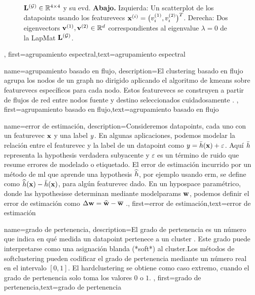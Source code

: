 {{\begin{figure}[H]
\begin{center}
{					${\bf L}^{(\mathcal{G})}  \in \mathbb{R}^{4 \times 4}$ y su \gls{evd}. 
					{\bf Abajo.} Izquierda: Un \gls{scatterplot} de los \gls{datapoint}s usando los \gls{featurevec}s 
					${\bf x}^{(i)} = \big( v^{(1)}_{i},v^{(2)}_{i} \big)^{T}$. 
					Derecha: Dos \gls{eigenvector}s ${\bf v}^{(1)},{\bf v}^{(2)} \in \mathbb{R}^{d}$ 
					correspondientes al \gls{eigenvalue} $\lambda=0$ de la \gls{LapMat} ${\bf L}^{(\mathcal{G})}$. 
					} 
			\end{center}
		\end{figure}
	\newpage}, 
	first={agrupamiento espectral},text={agrupamiento espectral} 
}
{name={agrupamiento basado en flujo},
	description={El \gls{clustering} basado en flujo agrupa los nodos de un 
		\gls{graph} no dirigido aplicando el algoritmo de \gls{kmeans} sobre
		\gls{featurevec}s específicos para cada nodo. Estos \gls{featurevec}s se construyen a partir de flujos de red entre nodos 
		fuente y destino seleccionados cuidadosamente \cite{FlowSpecClustering2021}. }, 
	first={agrupamiento basado en flujo},text={agrupamiento basado en flujo} 
}



{name={error de estimación},
	description={Consideremos \gls{datapoint}s, cada uno con un \gls{featurevec} ${\bf x}$ y una \gls{label} 
		$y$. En algunas aplicaciones, podemos modelar la relación entre el \gls{featurevec} y la \gls{label}
		de un \gls{datapoint} como $y = \bar{h}({\bf x}) + \varepsilon$. Aquí $\bar{h}$ 
		representa la \gls{hypothesis} verdadera subyacente y $\varepsilon$ es un término de ruido que resume errores de modelado o etiquetado.
		El error de estimación incurrido por un método de \gls{ml} que aprende una \gls{hypothesis} $\widehat{h}$, por ejemplo usando \gls{erm}, se define como 
		$\widehat{h}({\bf x}) - \bar{h}({\bf x})$, para algún \gls{featurevec} dado. 
		En un \gls{hypospace} paramétrico, donde las \gls{hypothesis}se determinan mediante
		\gls{modelparams} ${\bf w}$, podemos definir el error de estimación como  $\Delta {\bf w} = \widehat{{\bf w}} - \overline{{\bf w}}$ \cite{kay,hastie01statisticallearning}.},
	first={error de estimación},text={error de estimación} 
}


{name={grado de pertenencia},
	description={El grado de pertenencia es un número que indica en qué medida un \gls{datapoint} 
		pertenece a un \gls{cluster} \cite[Ch. 8]{MLBasics}. Este grado puede interpretarse 
		como una asignación blanda (*soft*) al \gls{cluster}.Los métodos de \Gls{softclustering} 
		pueden codificar el grado de pertenencia mediante un número real en el intervalo $[0,1]$. 
		El \Gls{hardclustering} se obtiene como caso extremo, cuando el grado de pertenencia solo toma los valores $0$ o $1$.
		}, 
		first={grado de pertenencia},text={grado de pertenencia} 
}

